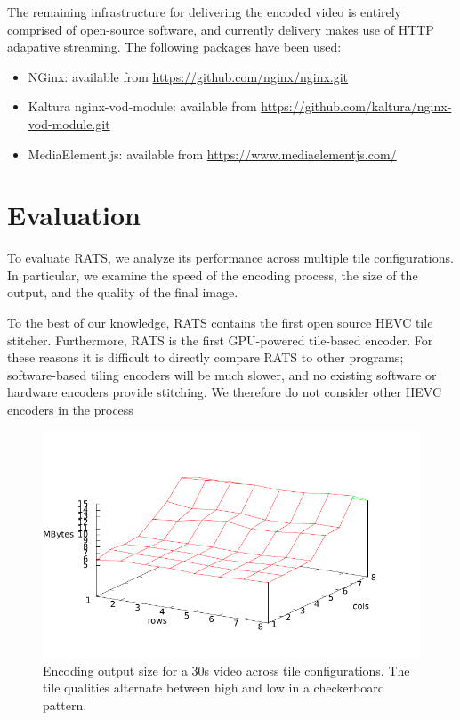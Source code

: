 The remaining infrastructure for delivering the encoded video is entirely comprised
of open-source software, and currently delivery makes use of HTTP adapative streaming.
The following packages have been used:
\begin{itemize}
\item NGinx: available from \url{https://github.com/nginx/nginx.git}
\item Kaltura nginx-vod-module: available from \url{https://github.com/kaltura/nginx-vod-module.git}
\item MediaElement.js: available from \url{https://www.mediaelementjs.com/}
\end{itemize}


\section{Evaluation}
To evaluate RATS, we analyze its performance across multiple tile configurations. In particular, we examine the speed of the encoding process, the size of the output, and the quality of the final image. 

To the best of our knowledge, RATS contains the first open source HEVC tile stitcher. Furthermore, RATS is the first GPU-powered tile-based encoder. For these reasons it is difficult to directly compare RATS to other programs; software-based tiling encoders will be much slower, and no existing software or hardware encoders provide stitching. We therefore do not consider other HEVC encoders in the process


\begin{figure}[t]
	\includegraphics[width=\columnwidth]{figures/Sizes.pdf}
	\caption{Encoding output size for a 30s video across tile configurations. The tile qualities alternate between high and low in a checkerboard pattern.}
\end{figure}

